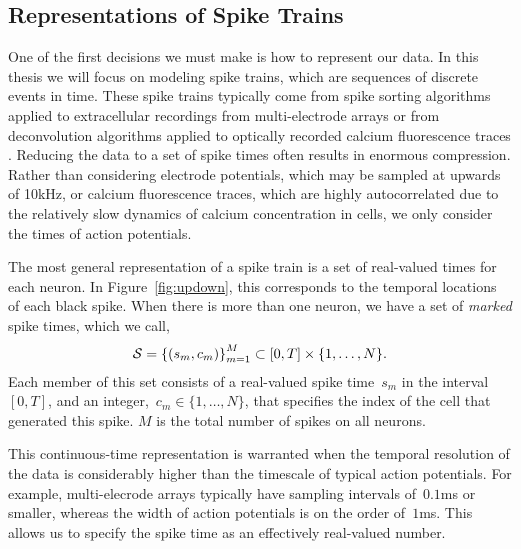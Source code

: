 \subsection{Representations of Spike Trains}
One of the first decisions we must make is how to
represent our data. In this thesis we will focus on modeling
spike trains, which are sequences of discrete events in time. These
spike trains typically come from spike sorting algorithms applied to
extracellular recordings from multi-electrode arrays
\citep{lewicki1998review} or from
deconvolution algorithms applied to optically recorded calcium
fluorescence traces \citep{pnevmatikakis2016simultaneous,
  vogelstein2010fast}. Reducing the data to a set of spike times often 
results in enormous compression. Rather than considering electrode 
potentials, which may be sampled at upwards of 10kHz, or calcium 
fluorescence traces, which are highly autocorrelated due to the relatively 
slow dynamics of calcium concentration in cells, we only consider 
the times of action potentials.


The most general representation 
of a spike train is a set of real-valued times for each neuron.
In Figure~\ref{fig:updown}, this corresponds to the temporal locations of
each black spike.
When there is more than one neuron, we have a set of
\emph{marked} spike times, which we call,
\begin{align*}
  \mathcal{S} = \left \{ (s_m, c_m) \right \}_{m=1}^M \subset [0, T] \times \{1, \ldots, N\}.
\end{align*}
Each member of this set consists of a real-valued spike time~$s_m$ in
the interval~$[0, T]$, and an integer,~$c_m \in \{1, \ldots, N\}$,
that specifies the index of the cell that generated this spike. $M$ is 
the total number of spikes on all neurons.

This continuous-time representation is
warranted when the temporal resolution of the data is considerably
higher than the timescale of typical action potentials. For example,
multi-elecrode arrays typically have sampling intervals of~$0.1$ms or
smaller, whereas the width of action potentials is on the order
of~$1$ms. This allows us to specify the spike time as an effectively
real-valued number.  


